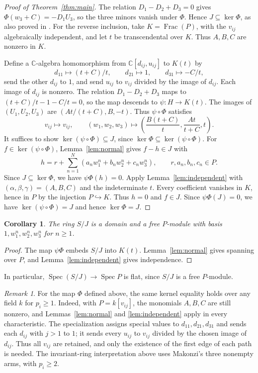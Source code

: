 \documentclass[11pt]{article}
\newtheorem{corollary}[theorem]{Corollary}
\theoremstyle{remark}
\newtheorem{remark}[theorem]{Remark}
\newcommand{\CC}{\mathbb C}
\DeclareMathOperator{\Frac}{Frac}
\begin{document}
\begin{proof}[Proof of Theorem~\ref{thm:main}]
The relation $D_1-D_2+D_3=0$ gives
$\Phi(w_3+C)=-D_1U_3$, so the three minors vanish under $\Phi$. Hence
$J\subseteq\ker\Phi$, as also proved in \cite[Proposition 5.1]{Makonzi}.
For the reverse inclusion, take $K=\Frac(P)$, with the $v_{ij}$ algebraically independent, and let $t$ be transcendental over $K$.
Thus $A,B,C$ are nonzero in $K$.

Define a $\CC$-algebra homomorphism from $\CC[d_{ij},u_{ij}]$ to $K(t)$ by
\[
 d_{11}\mapsto(t+C)/t,\qquad d_{21}\mapsto1,\qquad
 d_{31}\mapsto-C/t,
\]
send the other $d_{ij}$ to $1$, and send
$u_{ij}$ to $v_{ij}$ divided by the image of $d_{ij}$.
Each image of $d_{ij}$ is nonzero. The relation $D_1-D_2+D_3$ maps to
$(t+C)/t-1-C/t=0$, so the map descends to $\psi:H\to K(t)$.
The images of $(U_1,U_2,U_3)$ are $(At/(t+C),B,-t)$.
Thus $\psi\circ\Phi$ satisfies
\[
 v_{ij}\mapsto v_{ij},\qquad
 (w_1,w_2,w_3)\mapsto\left(\frac{B(t+C)}t,\frac{At}{t+C},t\right).
\]
It suffices to show $\ker(\psi\circ\Phi)\subseteq J$, since $\ker\Phi\subseteq\ker(\psi\circ\Phi)$.
For $f\in\ker(\psi\circ\Phi)$, Lemma~\ref{lem:normal} gives $f-h\in J$ with
\[
 h=r+\sum_{n=1}^{N}(a_nw_1^n+b_nw_2^n+c_nw_3^n),
 \qquad r,a_n,b_n,c_n\in P.
\]
Since $J\subseteq\ker\Phi$, we have
$\psi\Phi(h)=0$. Apply Lemma~\ref{lem:independent} with
$(\alpha,\beta,\gamma)=(A,B,C)$ and the indeterminate $t$. Every coefficient vanishes
in $K$, hence in $P$ by the injection $P\hookrightarrow K$.
Thus $h=0$ and $f\in J$. Since $\psi\Phi(J)=0$, we have
$\ker(\psi\circ\Phi)=J$ and hence $\ker\Phi=J$.
\end{proof}

\begin{corollary}\label{cor:free}
The ring $S/J$ is a domain and a free $P$-module with basis
$1,w_1^n,w_2^n,w_3^n$ for $n\ge1$.
\end{corollary}
\begin{proof}
The map $\psi\Phi$ embeds $S/J$ into $K(t)$.
Lemma~\ref{lem:normal} gives spanning over $P$, and
Lemma~\ref{lem:independent} gives independence.
\end{proof}
In particular, $\operatorname{Spec}(S/J)\to\operatorname{Spec}P$ is flat,
since $S/J$ is a free $P$-module.

\begin{remark}\label{rem:field}
For the map $\Phi$ defined above, the same kernel equality holds over
any field $k$ for $p_i\ge1$. Indeed, with $P=k[v_{ij}]$, the monomials
$A,B,C$ are still nonzero, and Lemmas~\ref{lem:normal} and
\ref{lem:independent} apply in every characteristic.
The specialization assigns special values to $d_{11},d_{21},d_{31}$
and sends each $d_{ij}$ with $j>1$ to $1$; it sends every $u_{ij}$
to $v_{ij}$ divided by the chosen image of $d_{ij}$.
Thus all $v_{ij}$ are retained, and only the existence of the first
edge of each path is needed.
The invariant-ring interpretation above uses Makonzi's three nonempty
arms, with $p_i\ge2$.
\end{remark}
\end{document}
